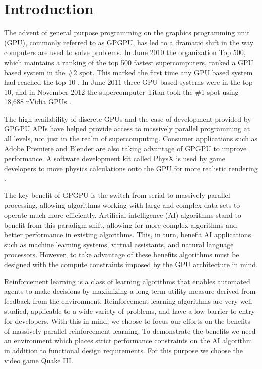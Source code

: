 \chapter{Introduction}
\label{chap:introduction}

The advent of general purpose programming on the graphics programming unit (GPU), commonly referred to as GPGPU, has led to a dramatic shift in the way computers are used to solve problems. In June 2010 the organization Top 500, which maintains a ranking of the top 500 fastest supercomputers, ranked a GPU based system in the \#2 spot. This marked the first time any GPU based system had reached the top 10 \cite{top500:2010}. In June 2011 three GPU based systems were in the top 10, and in November 2012 the supercomputer Titan took the \#1 spot using 18,688 nVidia GPUs \cite{top500:2011,top500:2012}.

The high availability of discrete GPUs and the ease of development provided by GPGPU APIs have helped provide access to massively parallel programming at all levels, not just in the realm of supercomputing. Consumer applications such as Adobe Premiere \cite{adobe} and Blender \cite{blender} are also taking advantage of GPGPU to improve performance. A software development kit called PhysX is used by game developers to move physics calculations onto the GPU for more realistic rendering \cite{physx}.

The key benefit of GPGPU is the switch from serial to massively parallel processing, allowing algorithms working with large and complex data sets to operate much more efficiently. Artificial intelligence (AI) algorithms stand to benefit from this paradigm shift, allowing for more complex algorithms and better performance in existing algorithms. This, in turn, benefit AI applications such as machine learning systems, virtual assistants, and natural language processors. However, to take advantage of these benefits algorithms must be designed with the compute constraints imposed by the GPU architecture in mind.

Reinforcement learning is a class of learning algorithms that enables automated agents to make decisions by maximizing a long term utility measure derived from feedback from the environment. Reinforcement learning algorithms are very well studied, applicable to a wide variety of problems, and have a low barrier to entry for developers. With this in mind, we choose to focus our efforts on the benefits of massively parallel reinforcement learning. To demonstrate the benefits we need an environment which places strict performance constraints on the AI algorithm in addition to functional design requirements. For this purpose we choose the video game Quake III.

